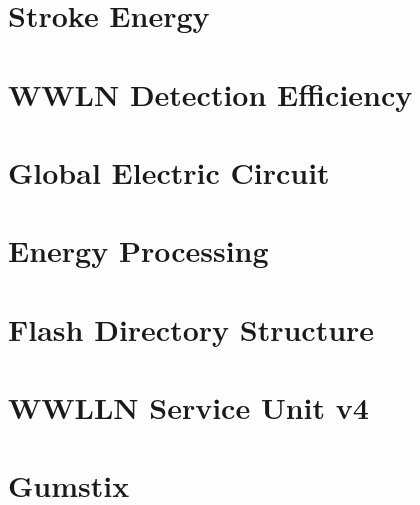\documentclass [11pt, twoside] {uwthesis}[2012/06/19]
\begin{document}
 
\chapter{Stroke Energy}




\chapter{WWLN Detection Efficiency}



 
\chapter{Global Electric Circuit}



%
%





%
%

\appendix
\raggedbottom\sloppy
 

\chapter{Energy Processing}

\chapter{Flash Directory Structure}

\chapter{WWLLN Service Unit v4}

\chapter{Gumstix}



\end{document}

